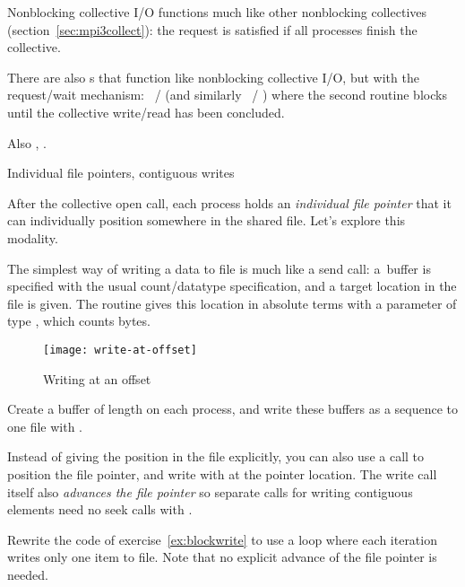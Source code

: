 Nonblocking collective I/O functions
much like other nonblocking collectives
(section~\ref{sec:mpi3collect}):
the request is satisfied if all processes finish the collective.

There are also s
that function like nonblocking collective I/O, but with the request/wait mechanism:
~/
(and similarly
~/
)
where the second routine blocks until the collective write/read
has been concluded.

Also , .

 {Individual file pointers, contiguous writes}
\label{sec:mpi-filepoint}

After the collective open call, each process holds an
\emph{individual file pointer}
that it can individually position somewhere in the shared file.
Let's explore this modality.

The simplest way of writing a data to file is much like a send call:
a~buffer is specified with the usual count/datatype specification,
and a target location in the file is given.
The routine  gives this location
in absolute terms with a parameter of type ,
which counts bytes.

\begin{figure}[ht]
  \label{fig:write-at}
  \caption{Writing at an offset}
  \texttt{[image: write-at-offset]}
\end{figure}

\begin{exercise}
  \label{ex:blockwrite}
  Create a buffer of length  on each process, and write
  these buffers as a sequence to one file with .
\end{exercise}

Instead of giving the position in the file explicitly, you can also
use a  call to position the file pointer,
and write with  at the pointer location.
The write call itself also 
\emph{advances the file pointer}
so separate calls for writing contiguous elements 
need no seek calls with .

\begin{exercise}
  \label{ex:blockadvance}
  Rewrite the code of exercise~\ref{ex:blockwrite} to
  use a loop where each iteration
  writes only one item to file.
  Note that no explicit advance of the file pointer is needed.
\end{exercise}


